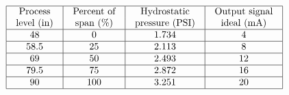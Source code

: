 $$\vbox{\offinterlineskip
\halign{\strut
\vrule \quad\hfil # \ \hfil & 
\vrule \quad\hfil # \ \hfil & 
\vrule \quad\hfil # \ \hfil & 
\vrule \quad\hfil # \ \hfil \vrule \cr
\noalign{\hrule}
%
Process & Percent of & Hydrostatic & Output signal \cr
%
level (in) & span (\%) & pressure (PSI) & ideal (mA) \cr
%
\noalign{\hrule}
%
48 & 0 & 1.734 & 4 \cr
%
\noalign{\hrule}
%
58.5 & 25 & 2.113 & 8 \cr
%
\noalign{\hrule}
%
69  & 50 & 2.493 & 12 \cr
%
\noalign{\hrule}
%
79.5 & 75 & 2.872 & 16 \cr
%
\noalign{\hrule}
%
90 & 100 & 3.251 & 20 \cr
%
\noalign{\hrule}
} %
}$$ %












